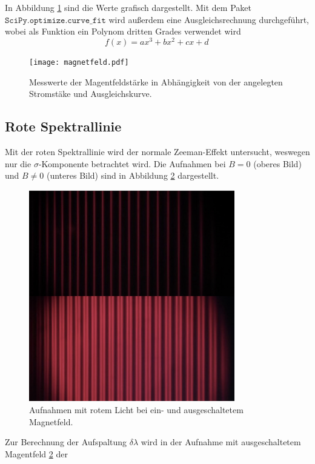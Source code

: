\FloatBarrier
\noindent
In Abbildung \ref{fig:afig1} sind die Werte grafisch dargestellt. Mit dem Paket $\texttt{SciPy.optimize.curve\_fit}$ wird außerdem 
eine Ausgleichsrechnung durchgeführt, wobei als Funktion ein Polynom dritten Grades verwendet wird
\begin{equation*}
    f \left(x\right) = a x^3 +b x^2 +c x +d \,
\end{equation*}
\FloatBarrier
\begin{figure}
    \centering
    \texttt{[image: magnetfeld.pdf]}
    \caption{Messwerte der Magentfeldstärke in Abhängigkeit von der angelegten Stromstäke und Ausgleichskurve.}
    \label{fig:afig1}
\end{figure}
\FloatBarrier
\subsection{Rote Spektrallinie}
Mit der roten Spektrallinie wird der normale Zeeman-Effekt untersucht, weswegen nur die $\sigma$-Komponente betrachtet wird.
Die Aufnahmen bei $B = 0$ (oberes Bild) und $B \neq 0$ (unteres Bild) sind in Abbildung \ref{fig:afig2} dargestellt.
\FloatBarrier
\begin{figure}
    \centering
    \includegraphics[width=0.8\textwidth]{rot.jpg}
    \caption{Aufnahmen mit rotem Licht bei ein- und ausgeschaltetem Magnetfeld.}
    \label{fig:afig2}
\end{figure}
\FloatBarrier
Zur Berechnung der Aufspaltung $\delta \lambda$ wird in der Aufnahme mit ausgeschaltetem Magentfeld \ref{fig:afig2} der 
